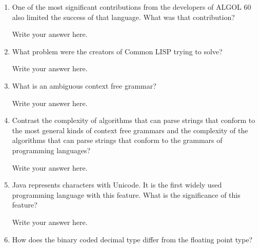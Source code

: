 \begin{enumerate}
\begin{answer}
    \end{answer}


  \item One of the most significant contributions from the developers
    of ALGOL 60 also limited the success of that language. What was
    that contribution?

  \begin{answer}

    Write your answer here.

    \end{answer}

  \item What problem were the creators of Common LISP trying to solve?

  \begin{answer}

    Write your answer here.

    \end{answer}

  \item What is an ambiguous context free grammar?

  \begin{answer}

    Write your answer here.

    \end{answer}

  \item Contrast the complexity of algorithms that can parse strings
    that conform to the most general kinds of context free grammars
    and the complexity of the algorithms that can parse strings that
    conform to the grammars of programming languages?

  \begin{answer}

    Write your answer here.

    \end{answer}

  \item Java represents characters with Unicode. It is the first
    widely used programming language with this feature. What is the
    significance of this feature?

  \begin{answer}

    Write your answer here.

    \end{answer}

  \item How does the binary coded decimal type differ from the
    floating point type?


\end{enumerate}
